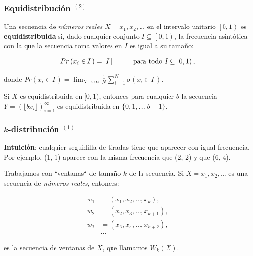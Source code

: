 \documentclass[t, 10pt, mathserif]{beamer}
\begin{document}

\begin{frame}
  \frametitle{Equidistribución {$^{(2)}$}}

  \begin{definition}
    Una secuencia de \textit{números reales} $X = x_1, x_2, \dots$ en el intervalo unitario $\left[0, 1\right)$ es \textbf{equidistribuida} si, dado cualquier conjunto $I \subseteq \left[0, 1\right)$, la frecuencia asintótica con la que la secuencia toma valores en $I$ es igual a su tamaño:
    \pause

    \begin{equation*}
      \begin{aligned}
        Pr \left( x_i \in I\, \right) = \left| I\, \right| \hspace*{1cm} \text{para todo } I \subseteq \left[0, 1\right) \text{,}
      \end{aligned}
    \end{equation*}
    \pause

    donde $Pr \left( x_i \in I\, \right) = \lim_{N \to \infty} \frac{1}{N} \sum_{i = 1}^{N} \sigma(x_i \in I\,)$.
  \end{definition}
  \pause

  Si $X$ es equidistribuida en $[0, 1)$, entonces para cualquier $b$ la secuencia $Y = \left( \lfloor b x_i \rfloor \right)_{i = 1}^{\infty}$ es equidistribuida en $\{ 0, 1, \dots, b - 1 \}$.
\end{frame}


\begin{frame}
  \frametitle{$k$-distribución {$^{(1)}$}}


  \textbf{Intuición}: cualquier seguidilla de tiradas tiene que aparecer con igual frecuencia. Por ejemplo, (1, 1) aparece con la misma frecuencia que (2, 2) y que (6, 4).
  \pause

  Trabajamos con ``ventanas`` de tamaño $k$ de la secuencia. Si $X = x_1, x_2, \dots$ es una secuencia de \textit{números reales}, entonces:
  \pause

  \vspace{-0.3cm}
  \begin{equation*}
    \begin{aligned}
        w_1 & = (x_1, x_2, \dots, x_k      ), \\
        w_2 & = (x_2, x_3, \dots, x_{k + 1}), \\
        w_3 & = (x_3, x_4, \dots, x_{k + 2}), \\
            & \dots
    \end{aligned}
  \end{equation*}

  es la secuencia de ventanas de $X$, que llamamos $W_k(X)$.
\end{frame}
\end{document}
